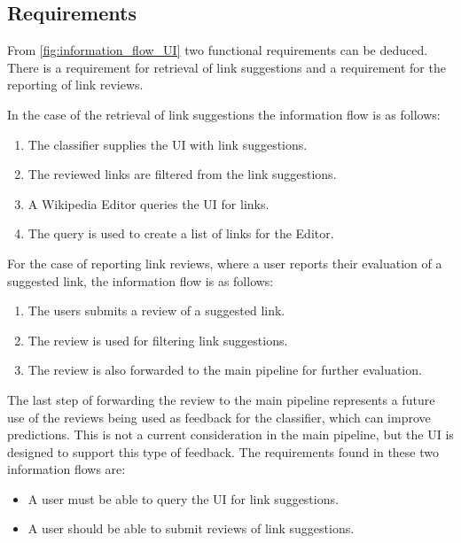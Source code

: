 \subsection{Requirements}\label{sec:uireqs}

From \cref{fig:information_flow_UI} two functional requirements can be deduced. There is a requirement for retrieval of link suggestions and a requirement for the reporting of link reviews.

In the case of the retrieval of link suggestions the information flow is as follows:

\begin{enumerate}
	\item The classifier supplies the UI with link suggestions.
	\item The reviewed links are filtered from the link suggestions.
	\item A Wikipedia Editor queries the UI for links.
	\item The query is used to create a list of links for the Editor.
\end{enumerate}

For the case of reporting link reviews, where a user reports their evaluation of a suggested link, the information flow is as follows:

\begin{enumerate}
	\item The users submits a review of a suggested link.
	\item The review is used for filtering link suggestions.
	\item The review is also forwarded to the main pipeline for further evaluation.
\end{enumerate}

The last step of forwarding the review to the main pipeline represents a future use of the reviews being used as feedback for the classifier, which can improve predictions. This is not a current consideration in the main pipeline, but the UI is designed to support this type of feedback. The requirements found in these two information flows are:

\begin{itemize}
	\item A user must be able to query the UI for link suggestions.
	\item A user should be able to submit reviews of link suggestions.
\end{itemize}

